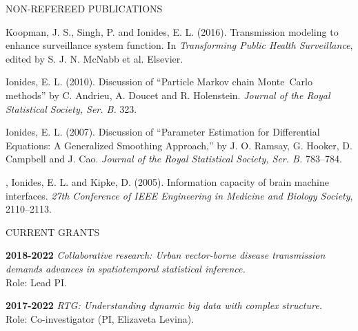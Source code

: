\lsp
\begin{reflist} {NON-REFEREED PUBLICATIONS}

\item
Koopman, J. S., Singh, P. and Ionides, E. L. (2016). Transmission modeling to enhance surveillance system function. In {\em Transforming Public Health Surveillance}, edited by S. J. N. McNabb et al. Elsevier.

\item\formal{[[\ionidesJRSSBb] ]} 
Ionides, E. L. (2010). Discussion of ``Particle Markov chain Monte~Carlo methods'' by C. Andrieu, A. Doucet and R. Holenstein.
{\em Journal of the Royal Statistical Society, Ser. B.} {}{\separator}323.

\item\formal{[[\ionidesJRSSBa] ]}  
Ionides, E. L. (2007). Discussion of ``Parameter Estimation for Differential Equations: A Generalized Smoothing Approach,'' by J. O. Ramsay, G. Hooker, D. Campbell and J. Cao. 
{\em Journal of the Royal Statistical Society, Ser. B.} {}{\separator}783--784.

\item\formal{[[\gageEMBS] ]}  
, Ionides, E. L. and
  Kipke, D. (2005). Information capacity of brain machine
  interfaces. {\em 27th Conference of IEEE Engineering in
  Medicine and Biology Society}, 2110--2113.


\end{reflist}


\lsp

\begin{mylist} {CURRENT GRANTS}

\item{\bf 2018-2022} {\em Collaborative research: Urban vector-borne disease transmission demands advances in spatiotemporal statistical inference.}
\\
Role: Lead PI.


\item{\bf 2017-2022 } {\em RTG: Understanding dynamic big data with complex structure.} 
\\
Role: Co-investigator (PI, Elizaveta Levina). 


\end{mylist}

